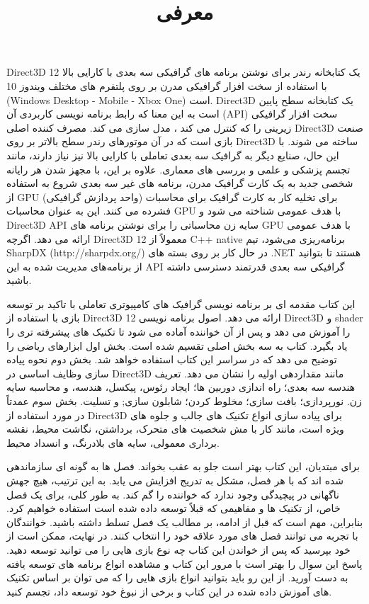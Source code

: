 \title{
    \center \Huge
    معرفی \\[25pt]
}

{ \large

{
    Direct3D 12
    یک کتابخانه رندر برای نوشتن برنامه های گرافیکی سه بعدی با کارایی بالا با استفاده از سخت افزار گرافیکی مدرن بر روی پلتفرم های مختلف ویندوز 10
    (Windows Desktop - Mobile - Xbox One)
    است.
    Direct3D
    یک کتابخانه سطح پایین است به این معنا که رابط برنامه نویسی کاربردی آن (API) سخت افزار گرافیکی زیرینی را که کنترل می کند ، مدل سازی می کند.
مصرف کننده اصلی Direct3D صنعت بازی است که در آن موتورهای رندر سطح بالاتر بر روی Direct3D ساخته می شوند.
با این حال، صنایع دیگر به گرافیک سه بعدی تعاملی با کارایی بالا نیز نیاز دارند، مانند تجسم پزشکی و علمی و بررسی های معماری.
علاوه بر این، با مجهز شدن هر رایانه شخصی جدید به یک کارت گرافیک مدرن، برنامه های غیر سه بعدی شروع به استفاده از GPU (واحد پردازش گرافیکی) برای تخلیه کار به کارت گرافیک برای محاسبات فشرده می کنند.
این به عنوان محاسبات GPU با هدف عمومی شناخته می شود و Direct3D API سایه زن محاسباتی را برای نوشتن برنامه های GPU با هدف عمومی ارائه می دهد.
اگرچه Direct3D 12 معمولاً از C++ native برنامه‌ریزی می‌شود، تیم
SharpDX (http://sharpdx.org/)
    در حال کار بر روی بسته های .NET هستند تا بتوانید از برنامه‌های مدیریت شده به این API گرافیکی سه بعدی قدرتمند دسترسی داشته باشید.
}

{این کتاب مقدمه ای بر برنامه نویسی گرافیک های کامپیوتری تعاملی با تاکید بر توسعه بازی با استفاده از Direct3D 12 ارائه می دهد. اصول برنامه نویسی Direct3D و shader را آموزش می دهد و پس از آن خواننده آماده می شود تا تکنیک های پیشرفته تری را یاد بگیرد. کتاب به سه بخش اصلی تقسیم شده است. بخش اول ابزارهای ریاضی را توضیح می دهد که در سراسر این کتاب استفاده خواهد شد. بخش دوم نحوه پیاده سازی وظایف اساسی در Direct3D مانند مقداردهی اولیه را نشان می دهد. تعریف هندسه سه بعدی؛ راه اندازی دوربین ها؛ ایجاد رئوس، پیکسل، هندسه، و محاسبه سایه زن. نورپردازی؛ بافت سازی؛ مخلوط کردن؛ شابلون سازی; و تسلیت. بخش سوم عمدتاً در مورد استفاده از Direct3D برای پیاده سازی انواع تکنیک های جالب و جلوه های ویژه است، مانند کار با مش شخصیت های متحرک، برداشتن، نگاشت محیط، نقشه برداری معمولی، سایه های بلادرنگ، و انسداد محیط.}

{برای مبتدیان، این کتاب بهتر است جلو به عقب بخواند. فصل ها به گونه ای سازماندهی شده اند که با هر فصل، مشکل به تدریج افزایش می یابد. به این ترتیب، هیچ جهش ناگهانی در پیچیدگی وجود ندارد که خواننده را گم کند. به طور کلی، برای یک فصل خاص، از تکنیک ها و مفاهیمی که قبلاً توسعه داده شده است استفاده خواهیم کرد. بنابراین، مهم است که قبل از ادامه، بر مطالب یک فصل تسلط داشته باشید. خوانندگان با تجربه می توانند فصل های مورد علاقه خود را انتخاب کنند. در نهایت، ممکن است از خود بپرسید که پس از خواندن این کتاب چه نوع بازی هایی را می توانید توسعه دهید. پاسخ این سوال را بهتر است با مرور این کتاب و مشاهده انواع برنامه های توسعه یافته به دست آورید. از این رو باید بتوانید انواع بازی هایی را که می توان بر اساس تکنیک های آموزش داده شده در این کتاب و برخی از نبوغ خود توسعه داد، تجسم کنید.}
}
